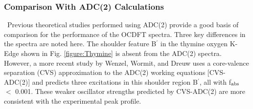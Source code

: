 \documentclass[12pt]{article}
\begin{document}
\subsubsection{Comparison With ADC(2) Calculations} \
Previous theoretical studies performed using ADC(2) provide a good basis of comparison for the performance of the OCDFT spectra. Three key differences in the spectra are noted here. 
The shoulder feature B$^{\prime}$ in the thymine oxygen K-Edge shown in Fig. \ref{figure:Thymine} is absent from the ADC(2) spectra\cite{plekan_theoretical_2008}. However, a more recent study by Wenzel, Wormit, and Dreuw \cite{wenzel_calculating_2014} uses a core-valence separation (CVS) approximation to the ADC(2) working equations [CVS-ADC(2)] and predicts three excitations in this shoulder region B$^{\prime}$, all with f$_{\rm abs}$ $<$ 0.001. These weaker oscillator strengths predicted by CVS-ADC(2) are more consistent with the experimental peak profile.
\end{document}
